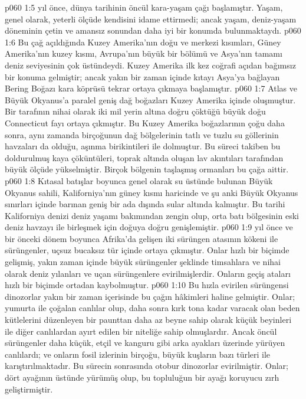 \vs p060 1:5  yıl önce, dünya tarihinin öncül kara\hyp{}yaşam çağı başlamıştır. Yaşam, genel olarak, yeterli ölçüde kendisini idame ettirmedi; ancak yaşam, deniz\hyp{}yaşam döneminin çetin ve amansız sonundan daha iyi bir konumda bulunmaktaydı.
\vs p060 1:6 Bu çağ açıldığında Kuzey Amerika’nın doğu ve merkezi kısımları, Güney Amerika’nın kuzey kısmı, Avrupa’nın büyük bir bölümü ve Asya’nın tamamı deniz seviyesinin çok üstündeydi. Kuzey Amerika ilk kez coğrafi açıdan bağımsız bir konuma gelmiştir; ancak yakın bir zaman içinde kıtayı Asya’ya bağlayan Bering Boğazı kara köprüsü tekrar ortaya çıkmaya başlamıştır.
\vs p060 1:7 Atlas ve Büyük Okyanus’a paralel geniş dağ boğazları Kuzey Amerika içinde oluşmuştur. Bir tarafının nihai olarak iki mil yerin altına doğru çöktüğü büyük doğu Connecticut fayı ortaya çıkmıştır. Bu Kuzey Amerika boğazlarının çoğu daha sonra, aynı zamanda birçoğunun dağ bölgelerinin tatlı ve tuzlu su göllerinin havzaları da olduğu, aşınma birikintileri ile dolmuştur. Bu süreci takiben bu doldurulmuş kaya çöküntüleri, toprak altında oluşan lav akıntıları tarafından büyük ölçüde yükselmiştir. Birçok bölgenin taşlaşmış ormanları bu çağa aittir.
\vs p060 1:8 Kıtasal batışlar boyunca genel olarak su üstünde bulunan Büyük Okyanus sahili, Kaliforniya’nın güney kısmı haricinde ve şu anki Büyük Okyanus sınırları içinde barınan geniş bir ada dışında sular altında kalmıştır. Bu tarihi Kaliforniya denizi deniz yaşamı bakımından zengin olup, orta batı bölgesinin eski deniz havzayı ile birleşmek için doğuya doğru genişlemiştir.
\vs p060 1:9  yıl önce  ve bir önceki dönem boyunca Afrika’da gelişen iki sürüngen atasının kökeni ile sürüngenler, uçsuz bucaksız tür içinde ortaya çıkmıştır. Onlar hızlı bir biçimde gelişmiş, yakın zaman içinde büyük sürüngenler şeklinde timsahlara ve nihai olarak deniz yılanları ve uçan sürüngenlere evirilmişlerdir. Onların geçiş ataları hızlı bir biçimde ortadan kaybolmuştur.
\vs p060 1:10 Bu hızla evirilen sürüngensi dinozorlar yakın bir zaman içerisinde bu çağın hâkimleri haline gelmiştir. Onlar; yumurta ile çoğalan canlılar olup, daha sonra kırk tona kadar varacak olan beden kütlelerini düzenleyen bir paunttan daha az beyne sahip olarak küçük beyinleri ile diğer canlılardan ayırt edilen bir niteliğe sahip olmuşlardır. Ancak öncül sürüngenler daha küçük, etçil ve kanguru gibi arka ayakları üzerinde yürüyen canlılardı; ve onların fosil izlerinin birçoğu, büyük kuşların bazı türleri ile karıştırılmaktadır. Bu sürecin sonrasında otobur dinozorlar evirilmiştir. Onlar; dört ayağının üstünde yürümüş olup, bu topluluğun bir ayağı koruyucu zırh geliştirmiştir.
